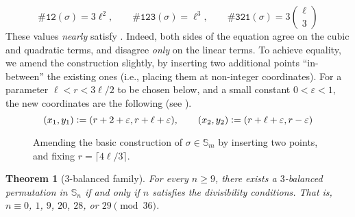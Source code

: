 \documentclass{article}
\newtheorem{theorem}{Theorem}[section]
\newcommand{\threeb}{$3$-balanced\xspace}
\newcommand{\Sn}{\mathbb{S}_n}
\newcommand{\pc}[2]{{\# \mathtt{ #1 } \left( #2 \right)}}
\newcommand{\eqdef}{\vcentcolon=}
\theoremstyle{remark}
\theoremstyle{plain}
\begin{document}
\[
    \pc{12}{\sigma} = 3 \ell^2, \qquad
    \pc{123}{\sigma} = \ell^3, \qquad
    \pc{321}{\sigma} = 3 \binom{\ell}{3}
\]
These values \emph{nearly} satisfy . Indeed, both sides of the equation agree on the cubic and quadratic terms, and disagree \emph{only} on the linear terms. To achieve equality, we amend the construction slightly, by inserting two additional points ``in-between'' the existing ones (i.e., placing them at non-integer coordinates). For a parameter $\ell < r < 3\ell/2$ to be chosen below, and a small constant $0 < \varepsilon < 1$, the new coordinates are the following (see ).
\[
    (x_1,y_1) \eqdef (r+2+\varepsilon,r+\ell+\varepsilon), \qquad
    (x_2,y_2) \eqdef (r+\ell+\varepsilon,r-\varepsilon)
\]
\begin{figure}[H]
    \centering
    \caption{Amending the basic construction of $\sigma\in\mathbb{S}_m$ by inserting two points, and fixing  $r=
    \lceil 4\ell / 3 \rceil$.}
    \label{fig:inc_segments_dec_with2}
\end{figure}
\begin{theorem}[$3$-balanced family]
    \label{thm:3balanced_construction}
    For every $n \ge 9$, there exists a \threeb permutation in $\Sn$ if and only if $n$ satisfies the divisibility conditions. That is, $n\equiv 0$, $1$, $9$, $20$, $28$, or $29 \pmod {36}$.
\end{theorem}
\end{document}
